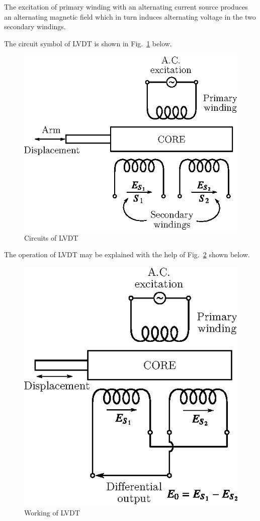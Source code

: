 The excitation of primary winding with an alternating current source
produces an alternating magnetic field which in turn induces
alternating voltage in the two secondary windings. 

The circuit symbol of LVDT is shown in Fig.~\ref{fig9.6} below.
\begin{figure}[H]
\centering
\includegraphics{chap9/fig9.4.eps}
\caption{Circuits of LVDT}\label{fig9.6}
\end{figure}

 The operation of LVDT may be explained with the
help of Fig.~\ref{fig9.7} shown below.
\begin{figure}[H]
\centering
\includegraphics{chap9/fig9.5.eps}
\caption{Working of LVDT}\label{fig9.7}
\end{figure}

